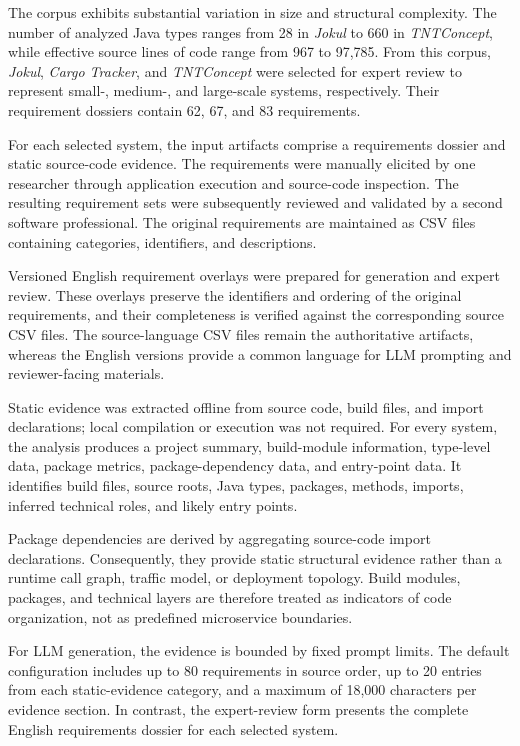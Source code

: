\documentclass[acmsmall,screen,anonymous,review]{acmart}
\begin{document}
The corpus exhibits substantial variation in size and structural complexity. The number of analyzed Java types ranges from 28 in \textit{Jokul} to 660 in \textit{TNTConcept}, while effective source lines of code range from 967 to 97,785. From this corpus, \textit{Jokul}, \textit{Cargo Tracker}, and \textit{TNTConcept} were selected for expert review to represent small-, medium-, and large-scale systems, respectively. Their requirement dossiers contain 62, 67, and 83 requirements.

For each selected system, the input artifacts comprise a requirements dossier and static source-code evidence. The requirements were manually elicited by one researcher through application execution and source-code inspection. The resulting requirement sets were subsequently reviewed and validated by a second software professional. The original requirements are maintained as CSV files containing categories, identifiers, and descriptions.

Versioned English requirement overlays were prepared for generation and expert review. These overlays preserve the identifiers and ordering of the original requirements, and their completeness is verified against the corresponding source CSV files. The source-language CSV files remain the authoritative artifacts, whereas the English versions provide a common language for LLM prompting and reviewer-facing materials.

Static evidence was extracted offline from source code, build files, and import declarations; local compilation or execution was not required. For every system, the analysis produces a project summary, build-module information, type-level data, package metrics, package-dependency data, and entry-point data. It identifies build files, source roots, Java types, packages, methods, imports, inferred technical roles, and likely entry points.

Package dependencies are derived by aggregating source-code import declarations. Consequently, they provide static structural evidence rather than a runtime call graph, traffic model, or deployment topology. Build modules, packages, and technical layers are therefore treated as indicators of code organization, not as predefined microservice boundaries.

For LLM generation, the evidence is bounded by fixed prompt limits. The default configuration includes up to 80 requirements in source order, up to 20 entries from each static-evidence category, and a maximum of 18,000 characters per evidence section. In contrast, the expert-review form presents the complete English requirements dossier for each selected system.
\end{document}
